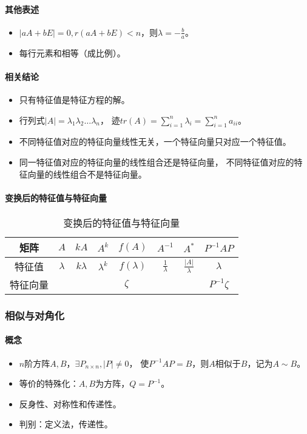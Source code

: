 \documentclass[
12pt, %
a4paper, 
oneside, %
headinclude,footinclude, %
]{scrartcl}
\begin{document}
\paragraph{其他表述}
\begin{itemize}
\item $ |aA + bE| = 0, r(aA + bE) < n $，则$ \lambda = -\frac{b}{a} $。
\item 每行元素和相等（成比例）。
\end{itemize}
\paragraph{相关结论}
\begin{itemize}
\item 只有特征值是特征方程的解。
\item 行列式$ |A| = \lambda_1 \lambda_2 \dots \lambda_n $，
迹$ tr(A) = \sum_{i = 1}^n \lambda_i = \sum_{i = 1}^n a_{ii} $。
\item 不同特征值对应的特征向量线性无关，一个特征向量只对应一个特征值。
\item 同一特征值对应的特征向量的线性组合还是特征向量，
不同特征值对应的特征向量的线性组合不是特征向量。
\end{itemize}
\paragraph{变换后的特征值与特征向量}
\begin{table}[hbt]
\caption{变换后的特征值与特征向量}
\centering
\begin{tabular}{|c|c|c|c|c|c|c|c|}
\hline
矩阵 & $ A $ & $ kA $ & $ A^k $ & $ f(A) $ & $ A^{-1} $ & $ A^* $ & $ P^{-1}AP $ \\
\hline
特征值 & $ \lambda $ & $ k\lambda $ & $ \lambda^k $ & $ f(\lambda) $ & $ \frac{1}{\lambda} $ & $ \frac{|A|}{\lambda} $ & $ \lambda $ \\
\hline
特征向量 & \multicolumn{6}{c|}{$ \zeta $} & $ P^{-1}\zeta $ \\
\hline
\end{tabular}
\end{table} 
\subsubsection{相似与对角化}
\paragraph{概念}
\begin{itemize}
\item $ n $阶方阵$ A,B $，$ \exists P_{n \times n}, |P| \neq 0 $，
使$ P^{-1}AP = B $，则$ A $相似于$ B $，记为$ A \sim B $。
\item 等价的特殊化：$ A,B $为方阵，$ Q = P^{-1} $。
\item 反身性、对称性和传递性。
\item 判别：定义法，传递性。
\end{itemize}
\end{document}
